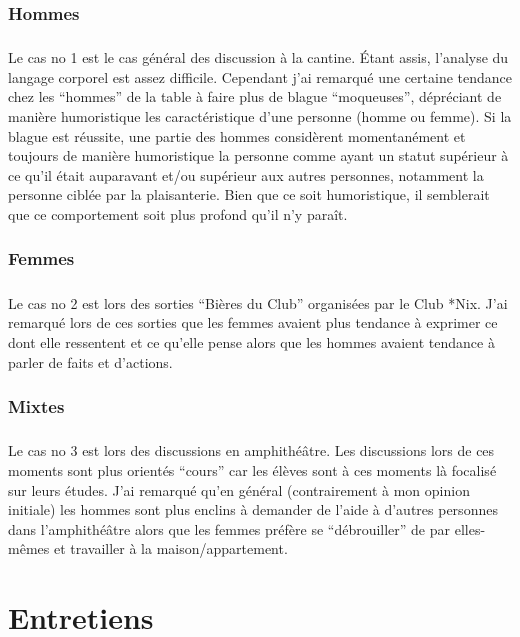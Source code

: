 \subsection{Hommes}
\paragraph{}
Le cas no 1 est le cas général des discussion à la cantine. Étant assis, l’analyse du langage corporel est assez difficile. Cependant j’ai remarqué une certaine tendance chez les “hommes” de la table à faire plus de blague “moqueuses”, dépréciant de manière humoristique les caractéristique d’une personne (homme ou femme). Si la blague est réussite, une partie des hommes considèrent momentanément et toujours de manière humoristique la personne comme ayant un statut supérieur à ce qu’il était auparavant et/ou supérieur aux autres personnes, notamment la personne ciblée par la plaisanterie. Bien que ce soit humoristique, il semblerait que ce comportement soit plus profond qu’il n’y paraît.

\subsection{Femmes}
\paragraph{}
Le cas no 2 est lors des sorties “Bières du Club” organisées par le Club *Nix.
J’ai remarqué lors de ces sorties que les femmes avaient plus tendance à exprimer
ce dont elle ressentent et ce qu’elle pense alors que les hommes avaient tendance
à parler de faits et d’actions.

\subsection{Mixtes}
\paragraph{}
Le cas no 3 est lors des discussions en amphithéâtre. Les discussions lors de
ces moments sont plus orientés “cours” car les élèves sont à ces moments là
focalisé sur leurs études. J’ai remarqué qu’en général (contrairement à mon
opinion initiale) les hommes sont plus enclins à demander de l’aide à d’autres personnes dans l’amphithéâtre alors que les femmes préfère se “débrouiller” de
par elles-mêmes et travailler à la maison/appartement.

\chapter{Entretiens}
